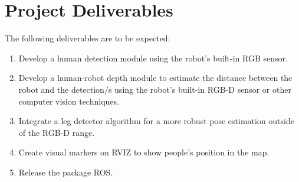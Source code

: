 \section{Project Deliverables}

The following deliverables are to be expected:

\begin{enumerate}
  \item Develop a human detection module using the robot's built-in RGB sensor.
  \item Develop a human-robot depth module to estimate the distance between the robot and the detection/s using the robot's built-in RGB-D sensor or other computer vision techniques.
  \item Integrate a leg detector algorithm for a more robust pose estimation outside of the RGB-D range.
  \item Create visual markers on RVIZ to show people's position in the map.
  \item Release the package ROS.
\end{enumerate}